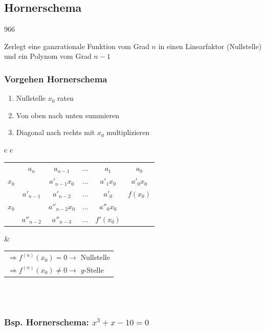 \subsection{Hornerschema}{966}

Zerlegt eine ganzrationale Funktion vom Grad $n$ in einen Linearfaktor (Nullstelle) und ein Polynom vom Grad $n-1$

\subsubsection{Vorgehen Hornerschema}

\begin{enumerate}
    \item Nullstelle $x_0$ raten
    \item Von oben nach unten summieren
    \item Diagonal nach rechts mit $x_0$ multiplizieren
\end{enumerate}	

\vspace{1em}

\renewcommand{\arraystretch}{1.1}
{\setlength{\tabcolsep}{2pt}
\begin{tabular}{c c}
    {\setlength{\tabcolsep}{6pt}
    \begin{tabular}{l| c c c c c}
                & $a_n$      & $a_{n-1}$      & $\ldots$      & $a_1$         & $a_0$ \\
        $x_0$   &            & $a'_{n-1}x_0$  & $\ldots$      & $a'_{1}x_0$   & $a'_{0}x_0$ \\
        \hline
                & $a'_{n-1}$ & $a'_{n-2}$     & $\ldots$      & $a'_{0}$      & $f(x_0)$ \\
        $x_0$   &            & $a''_{n-2}x_0$ & $\ldots$      & $a''_{0}x_0$ \\
        \hline
                & $a''_{n-2}$ & $a''_{n-3}$   & $\ldots$      & $f'(x_0)$
    \end{tabular}}
    &
    \begin{tabular}{l}
        $\Rightarrow f^{(n)}(x_0) = 0 \rightarrow$ Nullstelle\\
        $\Rightarrow f^{(n)}(x_0) \neq 0 \rightarrow$ $y$-Stelle\\
    \end{tabular}
\end{tabular}}\\ \\

\subsubsection*{Bsp. Hornerschema: \;\; $x^3+x-10=0$}

